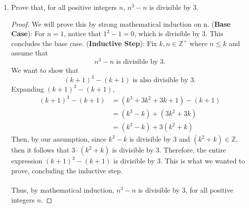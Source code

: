 \documentclass{article}
\begin{document}
\begin{enumerate}
    	\item Prove that, for all positive integers $n$, $n^3 - n$ is divisible by $3$.
                \begin{proof}
                    We will prove this by strong mathematical induction on n.
                    \ppar (\textbf{Base Case}): For $n = 1$, notice that $1^3 - 1 = 0$, which is divisible by $3$. This concludes the base case.
                    \ppar (\textbf{Inductive Step}): Fix $k, n\in\mathbb{Z}^+$ where $n \le k$ and assume that
                        \[
    			             n^3 - n\text{ is divisible by }3.
    		          \]
                    \ppar We want to show that
                        \[
    			             (k + 1)^3 - (k + 1)\text{ is also divisible by }3.
    		          \]
                    \ppar Expanding $(k + 1)^3 - (k + 1)$, 
                        \begin{align*}
                            (k + 1)^3 - (k + 1) &= (k^3 + 3k^2 + 3k + 1) - (k + 1) \\ 
                            &= (k^3 - k) + (3k^2 + 3k) \\
                            &= (k^3 - k) + 3(k^2 + k)
                        \end{align*}
                    \ppar Then, by our assumption, since $k^3 - k$ is divisible by $3$ and $(k^2 + k)\in\mathbb{Z}$, then it follows that $3\cdot(k^2 + k)$ is divisible by $3$. Therefore, the entire expression $(k + 1)^3 - (k + 1)$ is divisible by $3$. This is what we wanted to prove, concluding the inductive step.
                    \\\\ Thus, by mathematical induction, $n^3 - n$ is divisible by $3$, for all positive integers $n$.
                \end{proof}


\end{enumerate}
\end{document}
